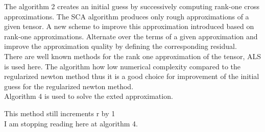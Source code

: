 \documentclass[10pt, draft]{article}
\begin{document}
   The algorithm 2 creates an initial guess by successively computing rank-one cross approximations.   The SCA algorithm produces only rough approximations of a given tensor.  A new scheme to improve this approximation introduced based on rank-one approximations.  Alternate over the terms of a given approximation and improve the approximation quality by defining the corresponding residual.  \\
   There are well known methods for the rank one approximation of the tensor, ALS is used here.  The algorithm how low numerical complexity compared to the regularized newton method thus it is a good choice for improvement of the initial guess for the regularized newton method.\\
   
   Algorithm 4 is used to solve the exted approximation.\linebreak[1]
   
   This method still increments r by 1\\
   I am stopping reading here at algorithm 4. 
\end{document}
